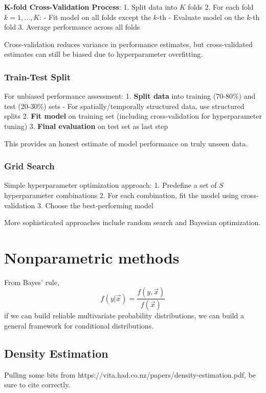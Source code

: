 \documentclass[
  letterpaper,
  DIV=11,
  numbers=noendperiod]{scrreprt}
\begin{document}
\textbf{K-fold Cross-Validation Process}: 1. Split data into \(K\) folds
2. For each fold \(k = 1, \ldots, K\): - Fit model on all folds except
the \(k\)-th - Evaluate model on the \(k\)-th fold 3. Average
performance across all folds

Cross-validation reduces variance in performance estimates, but
cross-validated estimates can still be biased due to hyperparameter
overfitting.

\subsubsection{Train-Test Split}\label{train-test-split}

For unbiased performance assessment: 1. \textbf{Split data} into
training (70-80\%) and test (20-30\%) sets - For spatially/temporally
structured data, use structured splits 2. \textbf{Fit model} on training
set (including cross-validation for hyperparameter tuning) 3.
\textbf{Final evaluation} on test set as last step

This provides an honest estimate of model performance on truly unseen
data.

\subsubsection{Grid Search}\label{grid-search}

Simple hyperparameter optimization approach: 1. Predefine a set of \(S\)
hyperparameter combinations 2. For each combination, fit the model using
cross-validation 3. Choose the best-performing model

More sophisticated approaches include random search and Bayesian
optimization.

\section{Nonparametric methods}\label{nonparametric-methods-1}

From Bayes' rule, \[
f(y | \vec{x}) = \frac{f(y, \vec{x})}{f(\vec{x})}
\] if we can build reliable multivariate probability distributions, we
can build a general framework for conditional distributions.

\subsection{Density Estimation}\label{density-estimation}

\begin{tcolorbox}[enhanced jigsaw, arc=.35mm, breakable, title=\textcolor{quarto-callout-note-color}{\faInfo}\hspace{0.5em}{Credit}, coltitle=black, opacityback=0, bottomtitle=1mm, colback=white, left=2mm, opacitybacktitle=0.6, toptitle=1mm, colframe=quarto-callout-note-color-frame, leftrule=.75mm, titlerule=0mm, rightrule=.15mm, bottomrule=.15mm, colbacktitle=quarto-callout-note-color!10!white, toprule=.15mm]

Pulling some bits from
https://vita.had.co.nz/papers/density-estimation.pdf, be sure to cite
correctly.

\end{tcolorbox}
\end{document}
